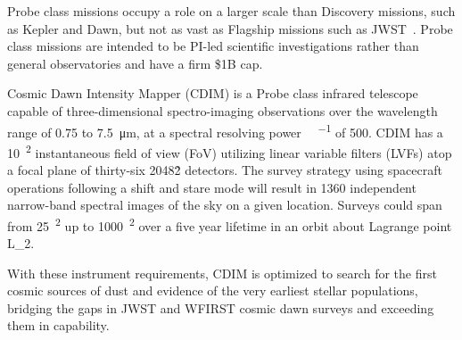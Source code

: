 \documentclass{ws-jai}
\begin{document}
Probe class missions occupy a role on a larger scale than Discovery missions, such as Kepler and Dawn, but not as vast as Flagship missions such as JWST~\cite{probeclasswp}.
Probe class missions are intended to be PI-led scientific investigations rather than general observatories and have a firm \$1B cap.

Cosmic Dawn Intensity Mapper (CDIM) is a Probe class infrared telescope capable of three-dimensional spectro-imaging observations over the wavelength range of 0.75 to \SI{7.5}{\micro\meter}, at a spectral resolving power \si{\Delta\lambda\per\lambda} of 500.
CDIM has a \SI{10}{\deg\squared} instantaneous field of view (FoV) utilizing linear variable filters (LVFs) atop a focal plane of thirty-six 2048\^{2} detectors.
The survey strategy using spacecraft operations following a shift and stare mode will result in 1360 independent narrow-band spectral images of the sky on a given location.
Surveys could span from \SI{25}{\deg\squared} up to \SI{1000}{\deg\squared} over a five year lifetime in an orbit about Lagrange point L_{2}\@.

With these instrument requirements, CDIM is optimized to search for the first cosmic sources of dust and evidence of the very earliest stellar populations, bridging the gaps in JWST and WFIRST cosmic dawn surveys and exceeding them in capability.
\end{document}
